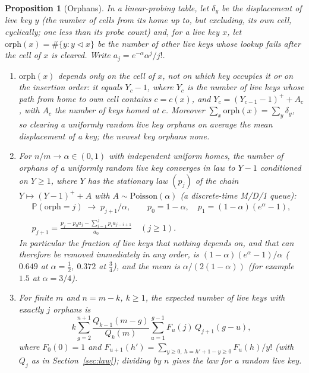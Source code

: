 \documentclass[11pt,a4paper]{article}
\newtheorem{proposition}[theorem]{Proposition}
\theoremstyle{definition}
\theoremstyle{remark}
\newcommand{\Prob}{\mathbb{P}}
\begin{document}
\begin{proposition}[Orphans]\label{prop:orphans}
In a linear-probing table, let $\delta_y$ be the displacement of live key $y$ (the number of cells from its home up to, but excluding, its own cell, cyclically; one less than its probe count) and, for a live key $x$, let $\mathrm{orph}(x)=\#\{y: y\lhd x\}$ be the number of other live keys whose lookup fails after the cell of $x$ is cleared. Write $a_j=e^{-\alpha}\alpha^j/j!$.
\begin{enumerate}[label=(\alph*),leftmargin=*,nosep]
\item $\mathrm{orph}(x)$ depends only on the cell of $x$, not on which key occupies it or on the insertion order: it equals $Y_c-1$, where $Y_c$ is the number of live keys whose path from home to own cell contains $c=c(x)$, and $Y_c=(Y_{c-1}-1)^++A_c$, with $A_c$ the number of keys homed at $c$. Moreover $\sum_x\mathrm{orph}(x)=\sum_y\delta_y$, so clearing a uniformly random live key orphans on average the mean displacement of a key; the newest key orphans none.
\item For $n/m\to\alpha\in(0,1)$ with independent uniform homes, the number of orphans of a uniformly random live key converges in law to $Y-1$ conditioned on $Y\ge1$, where $Y$ has the stationary law $(p_j)$ of the chain $Y\mapsto(Y-1)^++A$ with $A\sim\mathrm{Poisson}(\alpha)$ (a discrete-time M/D/1 queue):
\begin{gather*}
\Prob(\mathrm{orph}=j)\;\to\;p_{j+1}/\alpha,\qquad p_0=1-\alpha,\quad p_1=(1-\alpha)(e^{\alpha}-1),\\
p_{j+1}=\frac{p_j-p_0a_j-\sum_{i=1}^{j}p_ia_{j-i+1}}{a_0}\quad(j\ge1).
\end{gather*}
In particular the fraction of live keys that nothing depends on, and that can therefore be removed immediately in any order, is $(1-\alpha)(e^{\alpha}-1)/\alpha$ ($0.649$ at $\alpha=\tfrac12$, $0.372$ at $\tfrac34$), and the mean is $\alpha/(2(1-\alpha))$ (for example $1.5$ at $\alpha=3/4$).
\item For finite $m$ and $n=m-k$, $k\ge1$, the expected number of live keys with exactly $j$ orphans is
\[
k\sum_{g=2}^{n+1}\frac{Q_{k-1}(m-g)}{Q_k(m)}\sum_{u=1}^{g-1}F_u(j)\,Q_{j+1}(g-u),
\]
where $F_0(0)=1$ and $F_{u+1}(h')=\sum_{y\ge0,\ h=h'+1-y\ge0}F_u(h)/y!$ (with $Q_j$ as in Section~\ref{sec:law}); dividing by $n$ gives the law for a random live key.
\end{enumerate}
\end{proposition}
\end{document}
